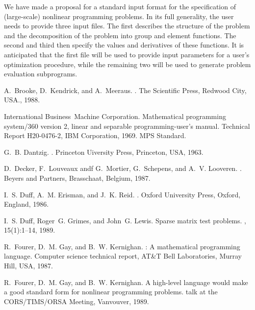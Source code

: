\documentclass[a4paper]{article}
\begin{document}
We  have made   a  proposal for  a    standard  input format  for  the
specification of (large-scale) nonlinear programming problems.  In its
full generality,  the user  needs  to provide  three input files.  The
first describes the structure of
the problem  and the decomposition of
the problem  into  group
and element  functions.
The second  and third then specify  the values  and derivatives
of these functions. It is anticipated that the first file will be used
to provide input parameters for a user's optimization procedure, while
the remaining   two  will  be  used   to generate problem   evaluation
subprograms.

\newpage

%
\begin{thebibliography}{10}

A.~Brooke, D.~Kendrick, and A.~Meeraus.
.
\newblock The Scientific Press, Redwood City, USA., 1988.

International Business~Machine Corporation.
\newblock Mathematical programming system/360 version 2, linear and separable
  programming-user's manual.
\newblock Technical Report H20-0476-2, IBM Corporation, 1969.
\newblock MPS Standard.

G.~B. Dantzig.
.
\newblock Princeton Uiversity Press, Princeton, USA, 1963.

D.~Decker, F.~Louveaux andf G.~Mortier, G.~Schepens, and A.~V. Looveren.
.
\newblock Beyers and Partners, Brasschaat, Belgium, 1987.

I.~S. Duff, A.~M. Erisman, and J.~K. Reid.
.
\newblock Oxford University Press, Oxford, England, 1986.

I.~S. Duff, Roger~G. Grimes, and John~G. Lewis.
\newblock Sparse matrix test problems.
, 15(1):1--14, 1989.

R.~Fourer, D.~M. Gay, and B.~W. Kernighan.
: A mathematical programming language.
\newblock Computer science technical report, AT\&T Bell Laboratories, Murray
  Hill, USA, 1987.

R.~Fourer, D.~M. Gay, and B.~W. Kernighan.
\newblock A high-level language would make a good standard form for nonlinear
  programming problems.
\newblock talk at the CORS/TIMS/ORSA Meeting, Vanvouver, 1989.


\end{thebibliography}
\end{document}
